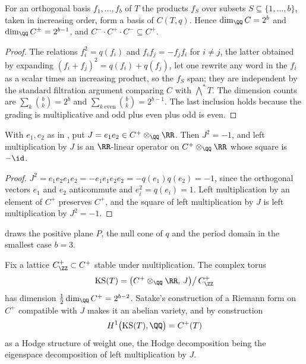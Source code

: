 \begin{lemma}\label{lem:cliffdim}
For an orthogonal basis $f_{1},\dots,f_{b}$ of $T$ the products $f_{S}$ over
subsets $S\subseteq\{1,\dots,b\}$, taken in increasing order, form a basis of
$C(T,q)$. Hence $\dim_{\QQ}C=2^{b}$ and $\dim_{\QQ}C^{\pm}=2^{b-1}$, and
$C^{-}\cdot C^{+}\cdot C^{-}\subseteq C^{+}$.
\end{lemma}

\begin{proof}
The relations $f_{i}^{2}=q(f_{i})$ and $f_{i}f_{j}=-f_{j}f_{i}$ for $i\ne j$,
the latter obtained by expanding $(f_{i}+f_{j})^{2}=q(f_{i})+q(f_{j})$, let one
rewrite any word in the $f_{i}$ as a scalar times an increasing product, so the
$f_{S}$ span; they are independent by the standard filtration argument
comparing $C$ with $\bigwedge^{*}T$. The dimension counts are
$\sum_{k}\binom{b}{k}=2^{b}$ and
$\sum_{k\ \mathrm{even}}\binom{b}{k}=2^{b-1}$. The last inclusion holds
because the grading is multiplicative and odd plus even plus odd is even.
\end{proof}

\begin{lemma}\label{lem:cliffJ}
With $e_{1},e_{2}$ as in , put $J=e_{1}e_{2}\in C^{+}\otimes_{\QQ}\RR$.
Then $J^{2}=-1$, and left multiplication by $J$ is an $\RR$-linear operator on
$C^{+}\otimes_{\QQ}\RR$ whose square is $-\id$.
\end{lemma}

\begin{proof}
$J^{2}=e_{1}e_{2}e_{1}e_{2}=-e_{1}e_{1}e_{2}e_{2}=-q(e_{1})q(e_{2})=-1$,
since the orthogonal vectors $e_{1}$ and $e_{2}$ anticommute and
$e_{i}^{2}=q(e_{i})=1$.
Left multiplication by an element of $C^{+}$ preserves $C^{+}$, and the square
of left multiplication by $J$ is left multiplication by $J^{2}=-1$.
\end{proof}

 draws the positive plane $P$, the null cone of $q$ and the
period domain in the smallest case $b=3$.

\begin{definition}\label{def:ksvariety}
Fix a lattice $C^{+}_{\ZZ}\subset C^{+}$ stable under multiplication. The
complex torus
\[
  \mathrm{KS}(T)=\bigl(C^{+}\otimes_{\QQ}\RR,\,J\bigr)\big/\,C^{+}_{\ZZ}
\]
has dimension $\tfrac12\dim_{\QQ}C^{+}=2^{b-2}$. Satake's construction of a
Riemann form on $C^{+}$ compatible with $J$ \cite{Sat66} makes it an abelian
variety, and by construction
\[
  H^{1}\bigl(\mathrm{KS}(T),\QQ\bigr)=C^{+}(T)
\]
as a Hodge structure of weight one, the Hodge decomposition being the
eigenspace decomposition of left multiplication by $J$.
\end{definition}


